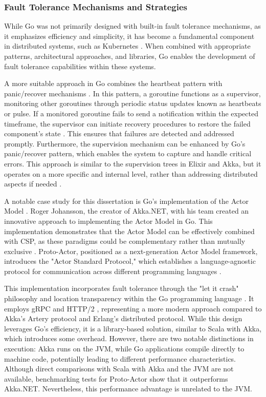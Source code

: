 \subsubsection{Fault Tolerance Mechanisms and Strategies}

While Go was not primarily designed with built-in fault tolerance mechanisms, as it emphasizes efficiency and simplicity, it has become a fundamental component in distributed systems, such as Kubernetes \cite{Castro2019, Kennedy2016}. When combined with appropriate patterns, architectural approaches, and libraries, Go enables the development of fault tolerance capabilities within these systems.

A more suitable approach in Go combines the heartbeat pattern with panic/recover mechanisms \cite{Cox-Buday2017}. In this pattern, a goroutine functions as a supervisor, monitoring other goroutines through periodic status updates known as heartbeats or pulse. If a monitored goroutine fails to send a notification within the expected timeframe, the supervisor can initiate recovery procedures to restore the failed component's state \cite{Cox-Buday2017, go-docs}. This ensures that failures are detected and addressed promptly. Furthermore, the supervision mechanism can be enhanced by Go's panic/recover pattern, which enables the system to capture and handle critical errors. This approach is similar to the supervision trees in Elixir and Akka, but it operates on a more specific and internal level, rather than addressing distributed aspects if needed \cite{go-docs}.

A notable case study for this dissertation is Go's implementation of the Actor Model \cite{Whitney2019}. Roger Johansson, the creator of Akka.NET, with his team created an innovative approach to implementing the Actor Model in Go. This implementation demonstrates that the Actor Model can be effectively combined with \gls{CSP}, as these paradigms could be complementary rather than mutually exclusive \cite{proto-actor-docs}. Proto-Actor, positioned as a next-generation Actor Model framework, introduces the "Actor Standard Protocol," which establishes a language-agnostic protocol for communication across different programming languages \cite{proto-actor-docs}.

This implementation incorporates fault tolerance through the "let it crash" philosophy and location transparency within the Go programming language \cite{proto-actor-docs}. It employs gRPC and HTTP/2 \cite{proto-actor-docs}, representing a more modern approach compared to Akka’s Artery protocol and Erlang’s distributed protocol. While this design leverages Go’s efficiency, it is a library-based solution, similar to Scala with Akka, which introduces some overhead. However, there are two notable distinctions in execution: Akka runs on the JVM, while Go applications compile directly to machine code, potentially leading to different performance characteristics. Although direct comparisons with Scala with Akka and the JVM are not available, benchmarking tests for Proto-Actor show that it outperforms Akka.NET. Nevertheless, this performance advantage is unrelated to the JVM.

